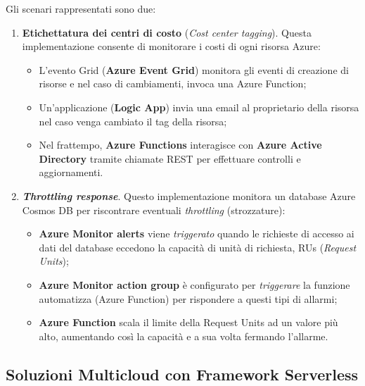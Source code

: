\documentclass[a4paper]{article}
\begin{document}
	\noindent
	Gli scenari rappresentati sono due:
	\begin{enumerate}
		\item \textbf{Etichettatura dei centri di costo} (\emph{Cost center tagging}). Questa implementazione consente di monitorare i costi di ogni risorsa Azure:
		\begin{itemize}
			\item L'evento Grid (\textbf{Azure Event Grid}) monitora gli eventi di creazione di risorse e nel caso di cambiamenti, invoca una Azure Function;
			
			\item Un'applicazione (\textbf{Logic App}) invia una email al proprietario della risorsa nel caso venga cambiato il tag della risorsa;
			
			\item Nel frattempo, \textbf{Azure Functions} interagisce con \textbf{Azure Active Directory} tramite chiamate REST per effettuare controlli e aggiornamenti.
		\end{itemize}
		
		\item \textbf{\emph{Throttling response}}. Questo implementazione monitora un database Azure Cosmos DB per riscontrare eventuali \emph{throttling} (strozzature):
		\begin{itemize}
			\item \textbf{Azure Monitor alerts} viene \emph{triggerato} quando le richieste di accesso ai dati del database eccedono la capacità di unità di richiesta, RUs (\emph{Request Units});
			
			\item \textbf{Azure Monitor action group} è configurato per \emph{triggerare} la funzione automatizza (Azure Function) per rispondere a questi tipi di allarmi;
			
			\item \textbf{Azure Function} scala il limite della Request Units ad un valore più alto, aumentando così la capacità e a sua volta fermando l'allarme.
		\end{itemize}
	\end{enumerate}\newpage
	
	\subsection{Soluzioni Multicloud con Framework Serverless}
	
\end{document}
